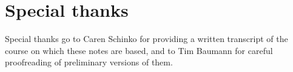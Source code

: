 \chapter*{Special thanks}

Special thanks go to Caren Schinko for providing a written transcript of the
course on which these notes are based, and to Tim Baumann for careful
proofreading of preliminary versions of them.
